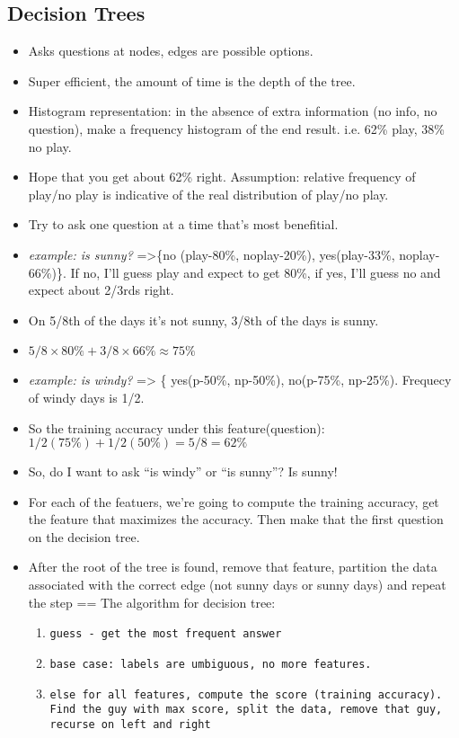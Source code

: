 \subsection{Decision Trees}
\begin{itemize}
\item Asks questions at nodes, edges are possible options.
\item Super efficient, the amount of time is the depth of the tree.
\item Histogram representation: in the absence of extra information
  (no info, no question), make a frequency histogram of the end result. i.e. 62\%
  play, 38\% no play.
\item Hope that you get about 62\% right. Assumption: relative frequency of
  play/no play is indicative of the real distribution of play/no play.
\item Try to ask one question at a time that's most benefitial.

\item \emph{example: is sunny?} =>\{no (play-80\%, noplay-20\%),
  yes(play-33\%, noplay-66\%)\}. If no, I'll guess play and expect to
  get 80\%, if yes, I'll guess no and expect about 2/3rds right.
\item On 5/8th of the days it's not sunny, 3/8th of the days is sunny.
\item $5/8\times 80\% + 3/8\times 66\% \approx 75\%$
\item \emph{example: is windy?} => \{ yes(p-50\%, np-50\%),
  no(p-75\%, np-25\%). Frequecy of windy days is 1/2.
\item So the training accuracy under this feature(question): $1/2(75\%) + 1/2(50\%) =5/8 = 62\% $
\item So, do I want to ask ``is windy'' or ``is sunny''? Is sunny!
\item For each of the featuers, we're going to compute the training
  accuracy, get the feature that maximizes the accuracy. Then make
  that the first question on the decision tree.
\item After the root of the tree is found, remove that feature,
  partition the data associated with the correct edge (not sunny days
  or sunny days) and repeat the step == The algorithm for decision
  tree:
  \begin{enumerate}
  \item \texttt{guess - get the most frequent answer}
  \item \texttt{base case: labels are umbiguous, no more features.}
  \item \texttt{else for all features, compute the score (training
    accuracy). Find the guy with max score, split the data, remove
    that guy, recurse on left and right}
  \end{enumerate}



\end{itemize}

